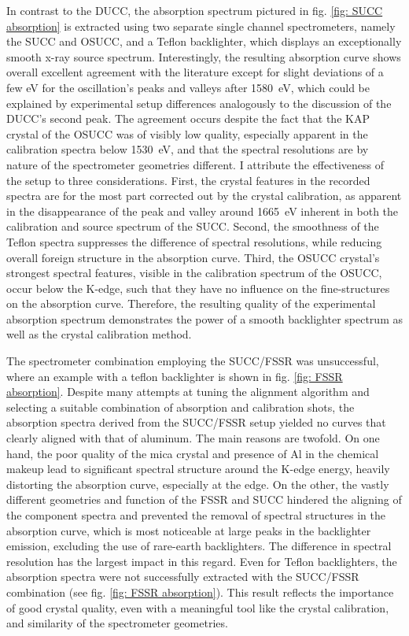 In contrast to the DUCC, the absorption spectrum pictured in fig. \ref{fig: SUCC absorption} is extracted using two separate single channel spectrometers, namely the SUCC and OSUCC, and a Teflon backlighter, which displays an exceptionally smooth x-ray source spectrum. Interestingly, the resulting absorption curve shows overall excellent agreement with the literature except for slight deviations of a few eV for the oscillation's peaks and valleys after \SI{1580}{\electronvolt}, which could be explained by experimental setup differences analogously to the discussion of the DUCC's second peak. The agreement occurs despite the fact that the KAP crystal of the OSUCC was of visibly low quality, especially apparent in the calibration spectra below \SI{1530}{\electronvolt}, and that the spectral resolutions are by nature of the spectrometer geometries different. I attribute the effectiveness of the setup to three considerations. First, the crystal features in the recorded spectra are for the most part corrected out by the crystal calibration, as apparent in the disappearance of the peak and valley around \SI{1665}{\electronvolt} inherent in both the calibration and source spectrum of the SUCC. Second, the smoothness of the Teflon spectra suppresses the difference of spectral resolutions, while reducing overall foreign structure in the absorption curve. Third, the OSUCC crystal's strongest spectral features, visible in the calibration spectrum of the OSUCC, occur below the K-edge, such that they have no influence on the fine-structures on the absorption curve. Therefore, the resulting quality of the experimental absorption spectrum demonstrates the power of a smooth backlighter spectrum as well as the crystal calibration method.

The spectrometer combination employing the SUCC/FSSR was unsuccessful, where an example with a teflon backlighter is shown in fig. \ref{fig: FSSR absorption}. Despite many attempts at tuning the alignment algorithm and selecting a suitable combination of absorption and calibration shots, the absorption spectra derived from the SUCC/FSSR setup yielded no curves that clearly aligned with that of aluminum. The main reasons are twofold. On one hand, the poor quality of the mica crystal and presence of Al in the chemical makeup lead to significant spectral structure around the K-edge energy, heavily distorting the absorption curve, especially at the edge. On the other, the vastly different geometries and function of the FSSR and SUCC hindered the aligning of the component spectra and prevented the removal of spectral structures in the absorption curve, which is most noticeable at large peaks in the backlighter emission, excluding the use of rare-earth backlighters. The difference in spectral resolution has the largest impact in this regard. Even for Teflon backlighters, the absorption spectra were not successfully extracted with the SUCC/FSSR combination (see fig. \ref{fig: FSSR absorption}). This result reflects the importance of good crystal quality, even with a meaningful tool like the crystal calibration, and similarity of the spectrometer geometries.


